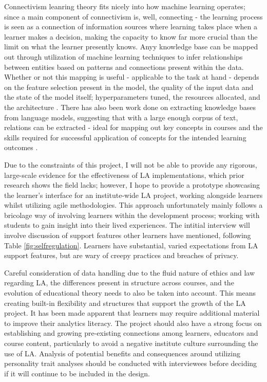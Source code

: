 \documentclass{l4proj}
\begin{document}
Connectivism leanring theory fits nicely into how machine learning operates; since a main component of connectivism is, well, connecting - 
the learning process is seen as a connection of information sources where learning takes place when a learner makes a decision, making the capacity to know far more crucial than the limit on what the learner presently knows. Anyy knowledge base can be mapped out through utilization of machine learning techniques to infer relationships between entities based on patterns and connections present within the data. Whether or not this mapping is useful - applicable to the task at hand - depends on the feature selection present in the model, the quality of the input data and the state of the model itself; hyperparameters tuned, the resources allocated, and the architecture \citet{despujol2022we}. There has also been work done on extracting knowledge bases from language models, suggesting that with a large enough corpus of text, relations can be extracted - ideal for mapping out key concepts in courses and the skills required for successful application of concepts for the intended learning outcomes \citet{petroni2019language}. 

Due to the constraints of this project, I will not be able to provide any rigorous, large-scale evidence for the effectiveness of LA implementations, which prior research shows the field lacks; however, I hope to provide a prototype showcasing the learner's interface for an institute-wide LA project, working alongside learners whilst utilizing agile methodologies. This approach unfortunately mainly follows a bricolage way of involving learners within the development process; working with students to gain insight into their lived experiences. The intitial interview will involve discussion of support features other learners have mentioned, following Table \ref{fig:selfregulation}. Learners have substantial, varied expectations from LA support features, but are wary of creepy practices and breaches of privacy. 

Careful consideration of data handling due to the fluid nature of ethics and law regarding LA, the differences present in structure across courses, and the evolution of educational theory needs to also be taken into account. This means creating built-in flexibility and structures that support the growth of the LA project. It has been made apparent that learners may require additional material to improve their analytics literacy. The project should also have a strong focus on establishing and growing pre-existing connections among learners, educators and course content, particularly to avoid a negative institute culture surrounding the use of LA. Analysis of potential benefits and consequences around utilizing personality trait analyses should be conducted with interviewees before deciding if it will continue to be included in the design. 
\end{document}
